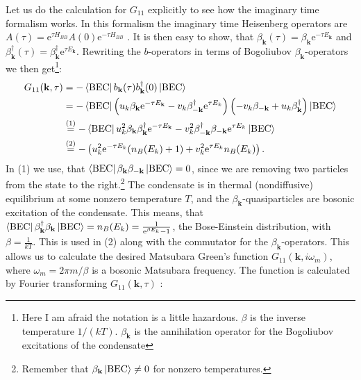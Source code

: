Let us do the calculation for $G_{11}$ explicitly to see how the imaginary time formalism works. In this formalism the imaginary time Heisenberg operators are $A(\tau) = \text{e}^{\tau H_{BB}}A(0)\text{e}^{-\tau H_{BB}}$ \cite{BruusFlensberg}. It is then easy to show, that $\beta_\mathbf{k}(\tau) = \beta_\mathbf{k}\text{e}^{-\tau E_\mathbf{k}}$ and $\beta^\dagger_\mathbf{k}(\tau) = \beta^\dagger_\mathbf{k}\text{e}^{\tau E_\mathbf{k}}$. Rewriting the $b$-operators in terms of Bogoliubov $\beta_\mathbf{k}$-operators we then get\footnote{Here I am afraid the notation is a little hazardous. $\beta$ is the inverse temperature $1/(kT)$. $\beta_\mathbf{k}$ is the annihilation operator for the Bogoliubov excitations of the condensate}:
\begin{align}
G_{11}(\mathbf{k},\tau) &= -\bra{\text{BEC}} b_\mathbf{k}(\tau)b_\mathbf{k}^\dagger(0)\ket{\text{BEC}} \nonumber \\
&= -\bra{\text{BEC}} \left(u_k\beta_\mathbf{k}\text{e}^{-\tau E_\mathbf{k}} - v_k \beta^\dagger_{-\mathbf{k}}\text{e}^{\tau E_k} \right)\left( -v_k\beta_{-\mathbf{k}} + u_k \beta^\dagger_{\mathbf{k}} \right)\ket{\text{BEC}} \nonumber \\
&\overset{(1)}{=} -\bra{\text{BEC}} u_k^2\beta_\mathbf{k}\beta^\dagger_\mathbf{k}\text{e}^{-\tau E_\mathbf{k}} - v_k^2 \beta^\dagger_{-\mathbf{k}}\beta_{-\mathbf{k}}\text{e}^{\tau E_k} \ket{\text{BEC}} \nonumber \\
&\overset{(2)}{=} -\left(u_k^2 \text{e}^{-\tau E_k}(n_B(E_k)+1)+ v_k^2\text{e}^{\tau E_k}n_B(E_k)\right). \nonumber
\end{align}
In (1) we use, that $\bra{\text{BEC}}\beta_\mathbf{k}\beta_{-\mathbf{k}}\ket{\text{BEC}} = 0$, since we are removing two particles from the state to the right.\footnote{Remember that $\beta_\mathbf{k}\ket{\text{BEC}} \neq 0$ for nonzero temperatures.} The condensate is in thermal  (nondiffusive) equilibrium at some nonzero temperature $T$, and the $\beta_\mathbf{k}$-quasiparticles are bosonic excitation of the condensate. This means, that $\bra{\text{BEC}}\beta_\mathbf{k}^\dagger\beta_{\mathbf{k}}\ket{\text{BEC}} = n_B(E_k) = \frac{1}{\text{e}^{\beta E_k}-1}$, the Bose-Einstein distribution, with $\beta = \frac{1}{kT}$. This is used in (2) along with the commutator for the $\beta_\mathbf{k}$-operators. This allows us to calculate the desired Matsubara Green's function $G_{11}(\mathbf{k},i\omega_m)$, where $\omega_m = 2\pi m/\beta$ is a bosonic Matsubara frequency. The function is calculated by Fourier transforming $G_{11}(\mathbf{k},\tau)$ \cite{BruusFlensberg}: 
